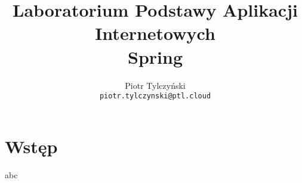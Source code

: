 \documentclass{article}
\begin{document}
    \title{Laboratorium Podstawy Aplikacji Internetowych \\
    Spring}
    \author{Piotr Tylczyński \\
    \texttt{piotr.tylczynski@ptl.cloud}}
    
    \begin{titlepage}
        \maketitle
    \end{titlepage}
    
    \tableofcontents
    \pagebreak
    
    \section{Wstęp}
    abc
\end{document}
